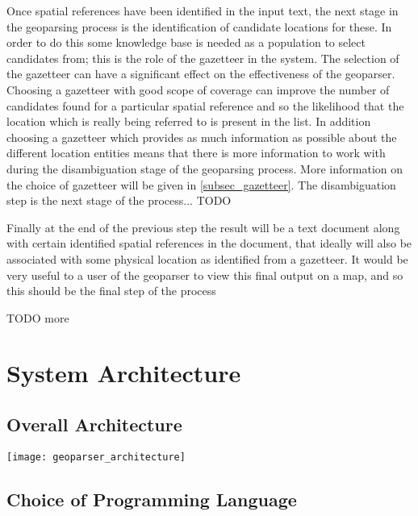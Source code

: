 \documentclass[12pt, a4paper]{report}
\begin{document}
Once spatial references have been identified in the input text, the next stage in the geoparsing process is the identification of candidate locations for these. In order to do this some knowledge base is needed as a population to select candidates from; this is the role of the gazetteer in the system. The selection of the gazetteer can have a significant effect on the effectiveness of the geoparser. Choosing a gazetteer with good scope of coverage can improve the number of candidates found for a particular spatial reference and so the likelihood that the location which is really being referred to is present in the list. In addition choosing a gazetteer which provides as much information as possible about the different location entities means that there is more information to work with during the disambiguation stage of the geoparsing process. More information on the choice of gazetteer will be given in \ref{subsec_gazetteer}. The disambiguation step is the next stage of the process... TODO

Finally at the end of the previous step the result will be a text document along with certain identified spatial references in the document, that ideally will also be associated with some physical location as identified from a gazetteer. It would be very useful to a user of the geoparser to view this final output on a map, and so this should be the final step of the process

TODO more

\section{System Architecture}

\subsection{Overall Architecture}

\texttt{[image: geoparser\_architecture]}

\subsection{Choice of Programming Language}
\end{document}
